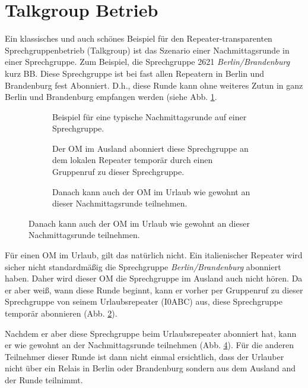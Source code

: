 \section{Talkgroup Betrieb} \label{sec:talkgroup}
Ein klassisches und auch schönes Beispiel für den Repeater-transparenten Sprechgruppenbetrieb (Talkgroup) ist das Szenario einer Nachmittagsrunde in einer Sprechgruppe. Zum Beispiel, die Sprechgruppe 2621 \emph{Berlin/Brandenburg} kurz BB. Diese Sprechgruppe ist bei fast allen Repeatern in Berlin und Brandenburg fest Abonniert. D.h., diese Runde kann ohne weiteres Zutun in ganz Berlin und Brandenburg empfangen werden (siehe Abb. \ref{fig:tgex1}. 

\begin{figure}[p]
 \centering
 \begin{subfigure}{\linewidth}
  \centering
  
  \caption{Beispiel für eine typische Nachmittagsrunde auf einer Sprechgruppe.} \label{fig:tgex1}
 \end{subfigure}
 \begin{subfigure}{\linewidth}
  \centering
  
  \caption{Der OM im Ausland abonniert diese Sprechgruppe an dem lokalen Repeater temporär durch einen Gruppenruf zu dieser Sprechgruppe.} \label{fig:tgex2}
 \end{subfigure}
 \begin{subfigure}{\linewidth}
  \centering
  
  \caption{Danach kann auch der OM im Urlaub wie gewohnt an dieser Nachmittagsrunde teilnehmen.} \label{fig:tgex3}
 \end{subfigure}
\end{figure}

Für einen OM im Urlaub, gilt das natürlich nicht. Ein italienischer Repeater wird sicher nicht standardmäßig die Sprechgruppe \emph{Berlin/Brandenburg} abonniert haben. Daher wird dieser OM die Sprechgruppe im Ausland auch nicht hören. Da er aber weiß, wann diese Runde beginnt, kann er vorher per Gruppenruf zu dieser Sprechgruppe von seinem Urlaubsrepeater (I0ABC) aus, diese Sprechgruppe temporär abonnieren (Abb. \ref{fig:tgex2}). 

Nachdem er aber diese Sprechgruppe beim Urlaubsrepeater abonniert hat, kann er wie gewohnt an der Nachmittagsrunde teilnehmen (Abb. \ref{fig:tgex3}). Für die anderen Teilnehmer dieser Runde ist dann nicht einmal ersichtlich, dass der Urlauber nicht über ein Relais in Berlin oder Brandenburg sondern aus dem Ausland and der Runde teilnimmt.

